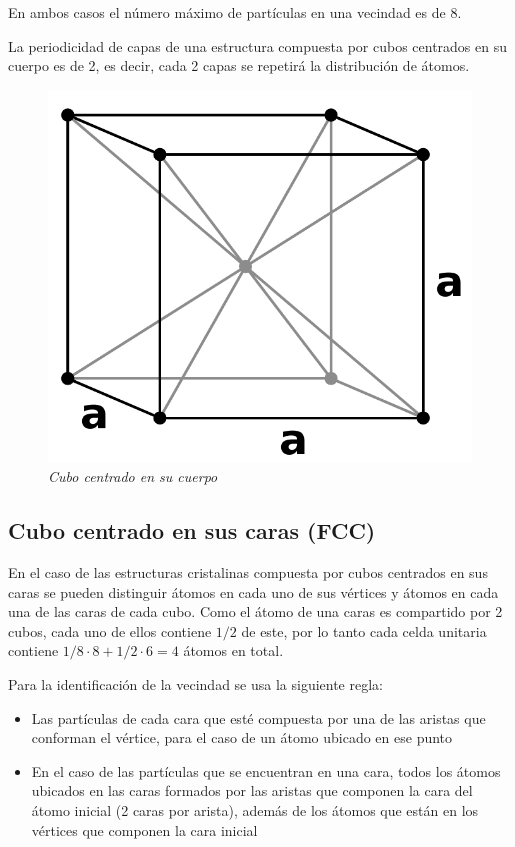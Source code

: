 En ambos casos el número máximo de partículas en una vecindad es de 8.

La periodicidad de capas de una estructura compuesta por cubos centrados en su cuerpo es de 2, es decir, cada 2 capas se repetirá la distribución de átomos.

\begin{figure}[H]
  \centering
  \includegraphics[scale=.6]{images/BodyCenteredCubic}
  \caption{\em Cubo centrado en su cuerpo}
\end{figure}


\subsection{Cubo centrado en sus caras (FCC)}
En el caso de las estructuras cristalinas compuesta por cubos centrados en sus caras se pueden distinguir átomos en cada uno de sus vértices y átomos en cada una de las caras de cada cubo. Como el átomo de una caras es compartido por 2 cubos, cada uno de ellos contiene $1/2$ de este, por lo tanto cada celda unitaria contiene $1/8 \cdot 8 + 1/2 \cdot 6 = 4$ átomos en total.

Para la identificación de la vecindad se usa la siguiente regla:

\begin{itemize}
  \item Las partículas de cada cara que esté compuesta por una de las aristas que conforman el vértice, para el caso de un átomo ubicado en ese punto
  \item En el caso de las partículas que se encuentran en una cara, todos los átomos ubicados en las caras formados por las aristas que componen la cara del átomo inicial (2 caras por arista), además de los átomos que están en los vértices que componen la cara inicial
\end{itemize}

